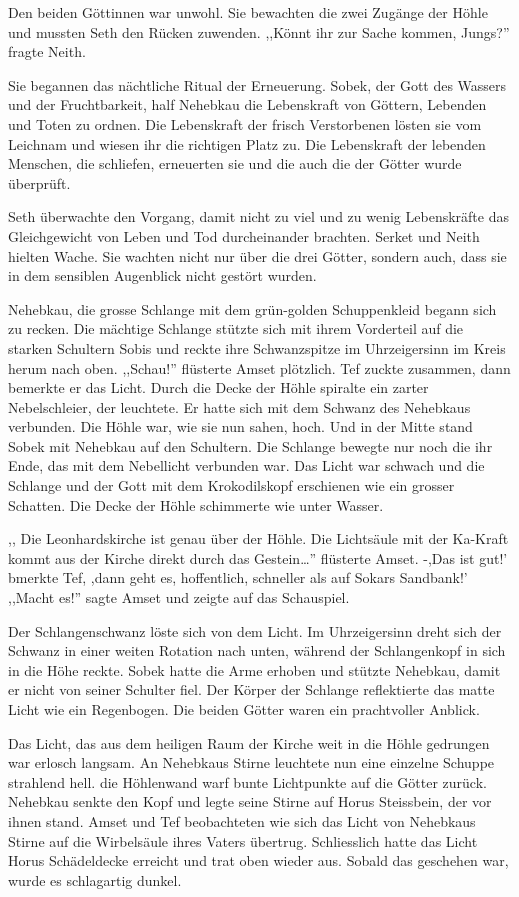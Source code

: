 \documentclass[11pt,titlepage,a5paper]{book}
\begin{document}
Den beiden Göttinnen war unwohl. Sie bewachten die zwei Zugänge der Höhle und mussten Seth den Rücken zuwenden. ,,Könnt ihr zur Sache kommen, Jungs?'' fragte Neith. 

Sie begannen das nächtliche Ritual der Erneuerung. Sobek, der Gott des Wassers und der Fruchtbarkeit, half Nehebkau die Lebenskraft von Göttern, Lebenden und Toten zu ordnen. Die Lebenskraft der frisch Verstorbenen lösten sie vom Leichnam und wiesen ihr die richtigen Platz zu. Die Lebenskraft der lebenden Menschen, die schliefen, erneuerten sie und die auch die der Götter wurde überprüft.

Seth überwachte den Vorgang, damit nicht zu viel und zu wenig Lebenskräfte das Gleichgewicht von Leben und Tod durcheinander brachten. Serket und Neith hielten Wache. Sie wachten nicht nur über die drei Götter, sondern auch, dass sie in dem sensiblen Augenblick nicht gestört wurden. 

Nehebkau, die grosse Schlange mit dem grün-golden Schuppenkleid begann sich zu recken. Die mächtige Schlange stützte sich mit ihrem Vorderteil auf die starken Schultern Sobis und reckte ihre Schwanzspitze im Uhrzeigersinn im Kreis herum nach oben. ,,Schau!'' flüsterte Amset plötzlich. Tef zuckte zusammen, dann bemerkte er das Licht. Durch die Decke der Höhle spiralte ein zarter Nebelschleier, der leuchtete. Er hatte sich mit dem Schwanz des Nehebkaus verbunden. Die Höhle war, wie sie nun sahen, hoch. Und in der Mitte stand Sobek mit Nehebkau auf den Schultern. Die Schlange bewegte nur noch die ihr Ende, das mit dem Nebellicht verbunden war.  Das Licht war schwach und die Schlange und der Gott mit dem Krokodilskopf erschienen wie ein grosser Schatten. Die Decke der Höhle schimmerte wie unter Wasser.

,, Die Leonhardskirche ist genau über der Höhle. Die Lichtsäule mit der Ka-Kraft kommt aus der Kirche direkt durch das Gestein\dots '' flüsterte Amset. -,Das ist gut!' bmerkte Tef, ,dann geht es, hoffentlich, schneller als auf Sokars Sandbank!' ,,Macht es!'' sagte Amset und zeigte auf das Schauspiel.

Der Schlangenschwanz löste sich von dem Licht. Im Uhrzeigersinn dreht sich der Schwanz in einer weiten Rotation nach unten, während der Schlangenkopf in sich in die Höhe reckte. Sobek hatte die Arme erhoben und stützte Nehebkau, damit er nicht von seiner Schulter fiel. Der Körper der Schlange reflektierte das matte Licht wie ein Regenbogen. Die beiden Götter waren ein prachtvoller Anblick.

Das Licht, das aus dem heiligen Raum der Kirche weit in die Höhle gedrungen war erlosch langsam. An Nehebkaus Stirne leuchtete nun eine einzelne Schuppe strahlend hell. die Höhlenwand warf bunte Lichtpunkte auf die Götter zurück. Nehebkau senkte den Kopf und legte seine Stirne auf Horus Steissbein, der vor ihnen stand. Amset und Tef beobachteten wie sich das Licht von Nehebkaus Stirne auf die Wirbelsäule ihres Vaters übertrug. Schliesslich hatte das Licht Horus Schädeldecke erreicht und trat oben wieder aus. Sobald das geschehen war, wurde es schlagartig dunkel.
\end{document}
